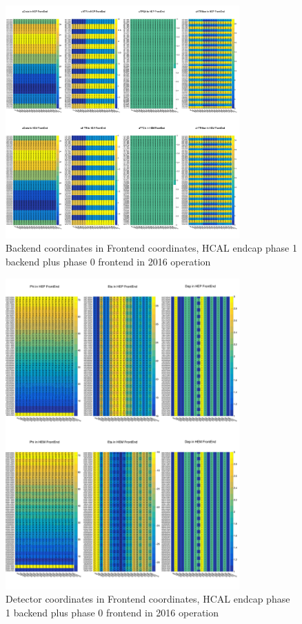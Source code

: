 \begin{figure}[htbp]
 \begin{center}
  \includegraphics[width=0.8\textwidth]{figures/c3/c3_cms_hcalhelmapfebe.png}
 \end{center}
 \caption{Backend coordinates in Frontend coordinates, HCAL endcap phase 1 backend plus phase 0 frontend in 2016 operation}
 \label{fig:c3cmshcalhelmapfebe}
\end{figure}

\begin{figure}[htbp]
 \begin{center}
  \includegraphics[width=0.8\textwidth]{figures/c3/c3_cms_hcalhelmapfegeo.png}
 \end{center}
 \caption{Detector coordinates in Frontend coordinates, HCAL endcap phase 1 backend plus phase 0 frontend in 2016 operation}
 \label{fig:c3cmshcalhelmapfegeo}
\end{figure}


